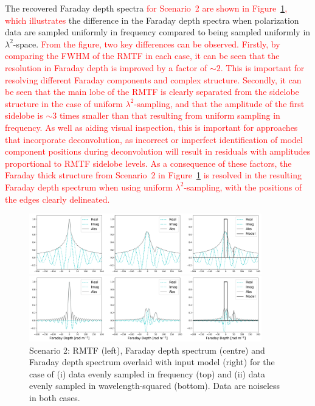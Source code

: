 \documentclass[fleqn,usenatbib]{mnras}
\begin{document}
The recovered Faraday depth spectra \textcolor{red}{for Scenario~2 are shown in Figure~\ref{fig:scen2samp}, which illustrates} the difference in the Faraday depth spectra when polarization data are sampled uniformly in frequency compared to being sampled uniformly in $\lambda^2$-space. \textcolor{red}{From the figure, two key differences can be observed. Firstly, by comparing the FWHM of the RMTF in each case, it can be seen that the resolution in Faraday depth is improved by a factor of $\sim2$. This is important for resolving different Faraday components and complex structure. Secondly, it can be seen that the main lobe of the RMTF is clearly separated from the sidelobe structure in the case of uniform $\lambda^2$-sampling, and that the amplitude of the first sidelobe is $\sim3$ times smaller than that resulting from uniform sampling in frequency. As well as aiding visual inspection, this is important for approaches that incorporate deconvolution, as incorrect or imperfect identification of model component positions during deconvolution will result in residuals with amplitudes proportional to RMTF sidelobe levels. As a consequence of these factors, the Faraday thick structure from Scenario~2 in Figure~\ref{fig:scen2samp} is resolved in the resulting Faraday depth spectrum when using uniform $\lambda^2$-sampling, with the positions of the edges clearly delineated.}
%
\begin{figure}
\centerline{\includegraphics[width=0.9\textwidth]{./FIGURES/Scenario2_fsamp.png}}
\centerline{\includegraphics[width=0.9\textwidth]{./FIGURES/Scenario2_lsamp.png}}
\caption{\label{fig:scen2samp} Scenario 2: RMTF (left), Faraday depth spectrum (centre) and Faraday depth spectrum overlaid with input model (right) for the case of (i) data evenly sampled in frequency (top) and (ii) data evenly sampled in wavelength-squared (bottom). Data are noiseless in both cases.}
\end{figure}
\end{document}
